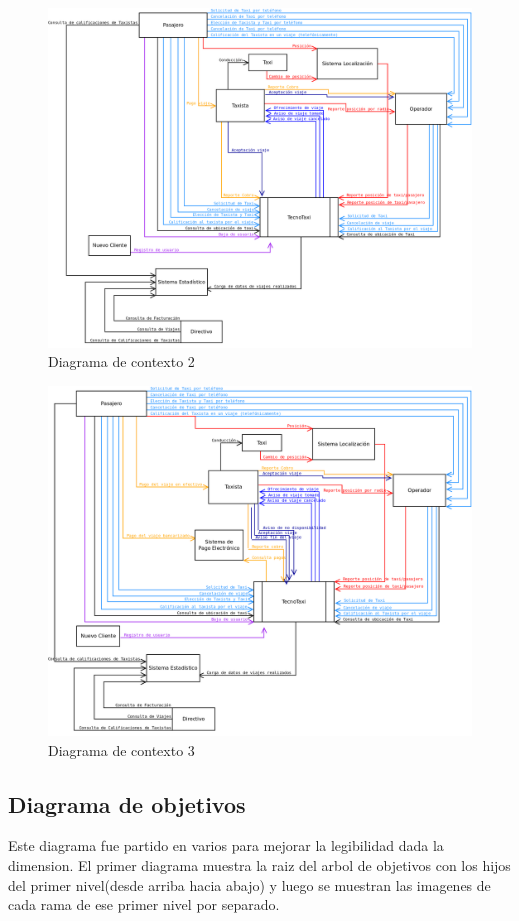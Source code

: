 \begin{figure}[h!]
  \centering    
    \includegraphics[scale=0.33]{diagramas/contexto/contextoAmpliado2.png}
  \caption{Diagrama de contexto 2}
\end{figure}

\begin{figure}[h!]
  \centering    
    \includegraphics[scale=0.33]{diagramas/contexto/contextoAmpliado3.png}
  \caption{Diagrama de contexto 3}
\end{figure}

\subsection{Diagrama de objetivos}
Este diagrama fue partido en varios para mejorar la legibilidad dada la dimension. El primer diagrama muestra la raiz del arbol de objetivos con los hijos del primer nivel(desde arriba hacia abajo) y luego se muestran las imagenes de cada rama de ese primer nivel por separado.

